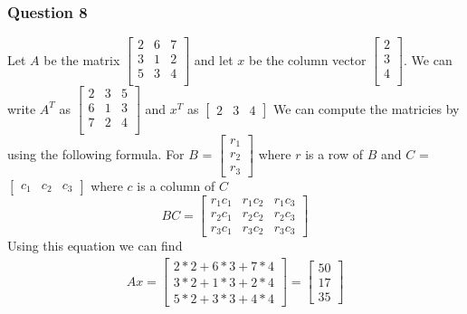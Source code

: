 \documentclass{article}
\begin{document}
\subsubsection*{Question 8}
Let $A$ be the matrix
$\begin{bmatrix}
  2 & 6 & 7\\
  3 & 1 & 2\\
  5 & 3 & 4\\
\end{bmatrix}$
and let $x$ be the column vector
$\begin{bmatrix}
  2\\
  3\\
  4\\
\end{bmatrix}$.
We can write $A^T$ as 
$\begin{bmatrix}
  2 & 3 & 5\\
  6 & 1 & 3\\
  7 & 2 & 4\\
\end{bmatrix}$ and $x^T$ as 
$\begin{bmatrix}
  2 & 3 & 4
\end{bmatrix}$
We can compute the matricies by using the following formula. For $B$ = 
$\begin{bmatrix}
  r_{1}\\
  r_{2}\\
  r_{3}
\end{bmatrix}$ where $r$ is a row of $B$ and $C$ = 
$\begin{bmatrix}
  c_{1} &
  c_{2} &
  c_{3}
\end{bmatrix}$ where $c$ is a column of $C$
\begin{equation}
  BC = \begin{bmatrix}
    r_1c_1 & r_1c_2 & r_1c_3 \\
    r_2c_1 & r_2c_2 & r_2c_3 \\
    r_3c_1 & r_3c_2 & r_3c_3
  \end{bmatrix}
\end{equation}
Using this equation we can find
\begin{align}
  Ax = 
  \begin{bmatrix}
    2*2 + 6*3 + 7*4 \\
    3*2 + 1*3 + 2*4 \\
    5*2 + 3*3 + 4*4
  \end{bmatrix} = 
  \begin{bmatrix}
    50 \\
    17 \\
    35
  \end{bmatrix}
\end{align}
\end{document}
